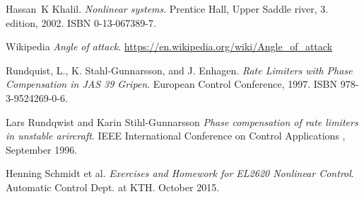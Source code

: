 
\begin{thebibliography}{99}
Hassan~K Khalil.
\newblock \emph{Nonlinear systems}.
\newblock Prentice Hall, Upper Saddle river, 3. edition, 2002.
\newblock ISBN 0-13-067389-7.

Wikipedia
\newblock \emph{Angle of attack}.
\newblock  \url{https://en.wikipedia.org/wiki/Angle_of_attack}

Rundquist, L., K. Stahl-Gunnarsson, and J. Enhagen.
\newblock \emph{Rate Limiters with Phase Compensation in JAS 39 Gripen}.
\newblock  European Control Conference, 1997.
\newblock ISBN 978-3-9524269-0-6.

Lars Rundqwist and Karin Stihl-Gunnarsson 
\newblock \emph{Phase compensation of rate limiters in unstable arircraft}.
 IEEE International Conference on Control Applications , September 1996. 

Henning Schmidt et al.
\newblock \emph{Exercises and Homework for EL2620 Nonlinear Control}.
\newblock Automatic Control Dept. at KTH. October 2015.
\end{thebibliography}